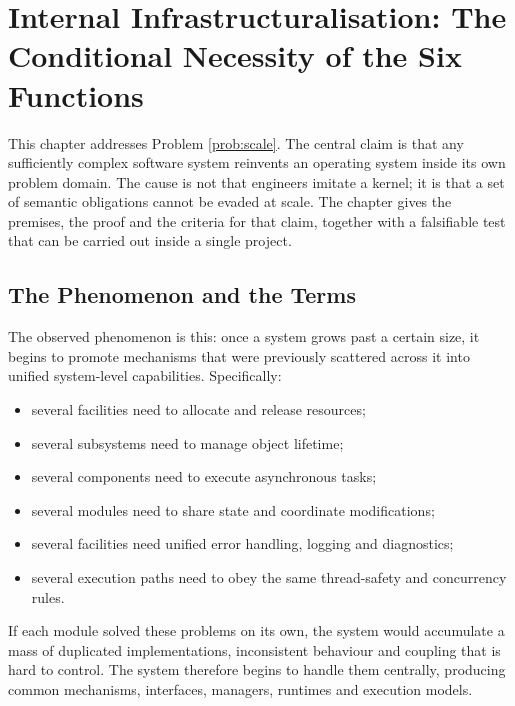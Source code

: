 \chapter[Internal Infrastructuralisation]{Internal Infrastructuralisation: The Conditional Necessity of the Six Functions}\label{ch:infrastructure}

This chapter addresses Problem \ref{prob:scale}. The central claim is that any sufficiently
complex software system reinvents an operating system inside its own problem domain. The
cause is not that engineers imitate a kernel; it is that a set of semantic obligations
cannot be evaded at scale. The chapter gives the premises, the proof and the criteria for
that claim, together with a falsifiable test that can be carried out inside a single
project.

\section{The Phenomenon and the Terms}\label{sec:phenomenon}

The observed phenomenon is this: once a system grows past a certain size, it begins to
promote mechanisms that were previously scattered across it into unified system-level
capabilities. Specifically:

\begin{itemize}
\item several facilities need to allocate and release resources;
\item several subsystems need to manage object lifetime;
\item several components need to execute asynchronous tasks;
\item several modules need to share state and coordinate modifications;
\item several facilities need unified error handling, logging and diagnostics;
\item several execution paths need to obey the same thread-safety and concurrency rules.
\end{itemize}

If each module solved these problems on its own, the system would accumulate a mass of
duplicated implementations, inconsistent behaviour and coupling that is hard to control. The
system therefore begins to handle them centrally, producing common mechanisms, interfaces,
managers, runtimes and execution models.

